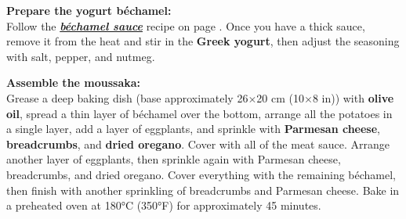 \textbf{Prepare the yogurt béchamel:} \\
Follow the \hyperref[sauce_bechamel]{\textbf{\textit{béchamel sauce}}} recipe on page \pageref{sauce_bechamel}. 
Once you have a thick sauce, remove it from the heat and stir in the \textbf{Greek yogurt}, then adjust the seasoning with salt, pepper, and nutmeg.

\textbf{Assemble the moussaka:} \\
Grease a deep baking dish (base approximately 26$\times$20 cm (10$\times$8 in)) with \textbf{olive oil}, spread a thin layer of béchamel over the bottom, arrange all the potatoes in a single layer, add a layer of eggplants, and sprinkle with \textbf{Parmesan cheese}, \textbf{breadcrumbs}, and \textbf{dried oregano}.
Cover with all of the meat sauce.
Arrange another layer of eggplants, then sprinkle again with Parmesan cheese, breadcrumbs, and dried oregano.
Cover everything with the remaining béchamel, then finish with another sprinkling of breadcrumbs and Parmesan cheese.
Bake in a preheated oven at 180°C (350°F) for approximately 45 minutes.

